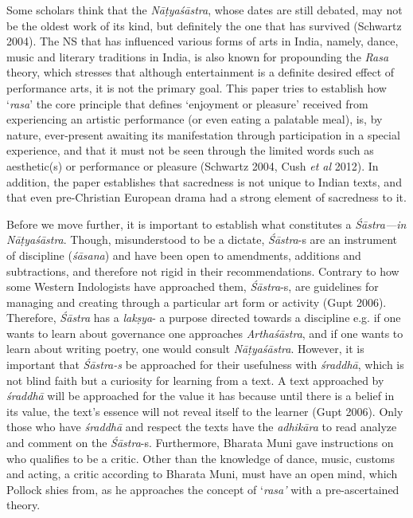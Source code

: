Some scholars think that the \textsl{Nāṭyaśāstra}, whose dates are still debated, may not be the oldest work of its kind, but definitely the one that has survived (Schwartz 2004). The NS that has influenced various forms of arts in India, namely, dance, music and literary traditions in India, is also known for propounding the \textsl{Rasa} theory, which stresses that although entertainment is a definite desired effect of performance arts, it is not the primary goal. This paper tries to establish how ‘\textsl{rasa}' the core principle that defines ‘enjoyment or pleasure’ received from experiencing an artistic performance (or even eating a palatable meal), is, by nature, ever-present awaiting its manifestation through participation in a special experience, and that it must not be seen through the limited words such as aesthetic(s) or performance or pleasure (Schwartz 2004, Cush \textsl{et al} 2012). In addition, the paper establishes that sacredness is not unique to Indian texts, and that even pre-Christian European drama had a strong element of sacredness to it. 

Before we move further, it is important to establish what constitutes a \textsl{Śāstra---in Nāṭyaśāstra}. Though, misunderstood to be a dictate, \hbox{\textsl{Śāstra}-s} are an instrument of discipline (\textsl{śāsana}) and have been open to amendments, additions and subtractions, and therefore not rigid in their recommendations. Contrary to how some Western Indologists have approached them, \textsl{Śāstra}-s, are guidelines for managing and creating through a particular art form or activity (Gupt 2006). Therefore, \textsl{Śāstra} has a \textsl{lakṣya}- a purpose directed towards a discipline e.g. if one wants to learn about governance one approaches \textsl{Arthaśāstra}, and if one wants to learn about writing poetry, one would consult \textsl{Nāṭyaśāstra}. However, it is important that \textsl{Śāstra-s} be approached for their usefulness with \textsl{śraddhā}, which is not blind faith but a curiosity for learning from a text. A text approached by \textsl{śraddhā} will be approached for the value it has because until there is a belief in its value, the text’s essence will not reveal itself to the learner (Gupt 2006).  Only those who have \textsl{śraddhā} and respect the texts have the \textsl{adhikāra} to read analyze and comment on the \hbox{\textsl{Śāstra}-s}. Furthermore, Bharata Muni gave instructions on who qualifies to be a critic. Other than the knowledge of dance, music, customs and acting, a critic according to Bharata Muni, must have an open mind, which Pollock shies from, as he approaches the concept of ‘\textsl{rasa’} with a pre-ascertained theory.

